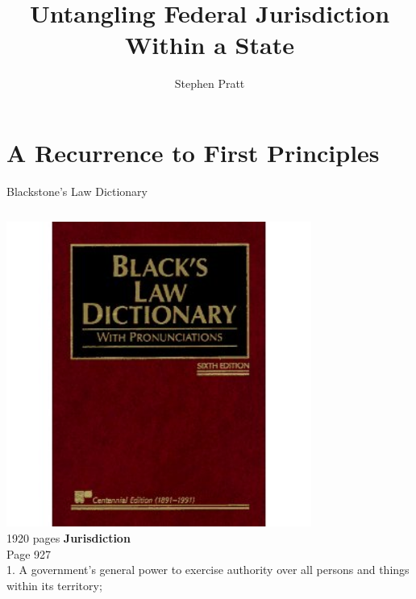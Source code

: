 




\title[Untangling Federal Jurisdiction]{Untangling Federal Jurisdiction Within a State}
\author{Stephen Pratt}

\frame{\titlepage}

\section{A Recurrence to First Principles}

\frame{\mysectionpage}


\begin{frame}{Blackstone's Law Dictionary}
    \begin{columns}[onlytextwidth]
            \centering
            \includegraphics[width=0.75\textwidth]{img/blacks-law.png}
            \\ { \tiny 1920 pages }
        \textbf{Jurisdiction} \\
        Page 927 \\
        1.  A government's general power to exercise authority over all persons and things within its territory;
    \end{columns}
\end{frame}

